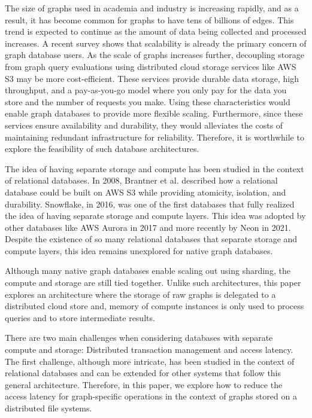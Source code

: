 The size of graphs used in academia and industry is increasing rapidly, and as a result, 
it has become common for graphs to have tens of
billions of edges\cite{sahu2017ubiquity}. This trend is expected to
continue as the amount of data being collected and processed increases. A recent
survey shows that scalability is already the primary concern of graph database
users\cite{sahu2017ubiquity}. As the scale of graphs
increases further, decoupling storage from graph query evaluations using distributed
cloud storage services like AWS S3\cite{awsS3} may be
more cost-efficient. These services provide durable data storage, high
throughput, and a pay-as-you-go model where you only pay for the data you store
and the number of requests you make. Using these characteristics would
enable graph databases to provide more flexible scaling. Furthermore, since
these services ensure availability and durability, they would alleviates 
the costs of maintaining redundant infrastructure for reliability. 
Therefore, it is worthwhile to explore the feasibility of such database architectures.

\medskip
The idea of having separate storage and compute has been studied in the context
of relational databases. In 2008, Brantner et al.\cite{brantner2008building}
described how a relational database could be built on AWS S3 while 
providing atomicity, isolation, and durability.
Snowflake\cite{dageville2016snowflake}, in 2016, was
one of the first databases that fully realized the idea of having
separate storage and compute layers. This idea was adopted by other databases
like AWS Aurora\cite{verbitski2017amazon} in 2017 and more recently by
Neon\cite{neonPostgres} in 2021. Despite the existence of so many relational databases
that separate storage and compute layers, this idea remains unexplored for
native graph databases.

\medskip
Although many native graph databases enable scaling out
using sharding\cite{besta2023demystifying}, the compute and storage are
still tied together. Unlike such architectures, this paper explores an
architecture where the storage of raw graphs is delegated to a distributed cloud
store and, memory of compute instances is only used to process queries and to store
intermediate results.

\medskip
There are two main challenges when considering databases with separate compute
and storage: Distributed transaction management and access latency. The first
challenge, although more intricate, has been studied in the context of
relational databases\cite{brantner2008building} and can be extended for other
systems that follow this general architecture. Therefore, in this paper, we
explore how to reduce the access latency for graph-specific operations in
the context of graphs stored on a distributed file systems.


